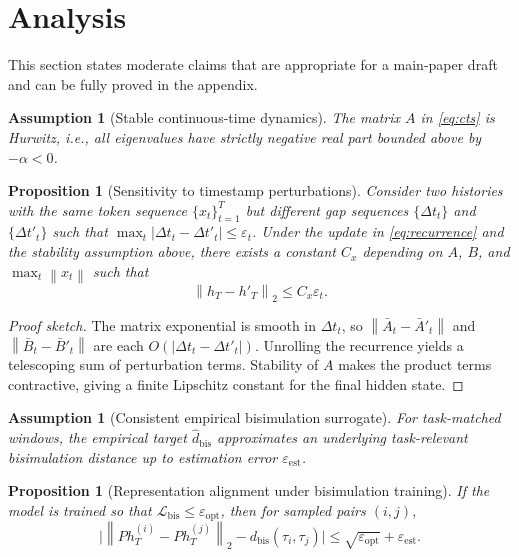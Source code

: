 \documentclass[11pt]{article}
\newtheorem{proposition}[theorem]{Proposition}
\newtheorem{assumption}[theorem]{Assumption}
\newcommand{\cL}{\mathcal{L}}
\newcommand{\dt}{\Delta t}
\newcommand{\norm}[1]{\left\lVert #1 \right\rVert}
\newcommand{\abs}[1]{\left\lvert #1 \right\rvert}
\newcommand{\traj}{\tau}
\begin{document}
\section{Analysis}

This section states moderate claims that are appropriate for a main-paper draft and can be fully proved in the appendix.

\begin{assumption}[Stable continuous-time dynamics]
The matrix $A$ in \cref{eq:cts} is Hurwitz, i.e., all eigenvalues have strictly negative real part bounded above by $-\alpha < 0$.
\end{assumption}

\begin{proposition}[Sensitivity to timestamp perturbations]
\label{prop:jitter}
Consider two histories with the same token sequence $\{x_t\}_{t=1}^{T}$ but different gap sequences $\{\dt_t\}$ and $\{\dt'_t\}$ such that $\max_t \abs{\dt_t-\dt'_t} \le \varepsilon_t$. Under the update in \cref{eq:recurrence} and the stability assumption above, there exists a constant $C_x$ depending on $A$, $B$, and $\max_t \norm{x_t}$ such that
\begin{equation}
\norm{h_T - h'_T}_2 \le C_x \varepsilon_t.
\label{eq:jitterbound}
\end{equation}
\end{proposition}

\begin{proof}[Proof sketch]
The matrix exponential is smooth in $\dt_t$, so $\norm{\bar A_t-\bar A'_t}$ and $\norm{\bar B_t-\bar B'_t}$ are each $O(\abs{\dt_t-\dt'_t})$. Unrolling the recurrence yields a telescoping sum of perturbation terms. Stability of $A$ makes the product terms contractive, giving a finite Lipschitz constant for the final hidden state.
\end{proof}

\begin{assumption}[Consistent empirical bisimulation surrogate]
For task-matched windows, the empirical target $\widehat{d}_{\mathrm{bis}}$ approximates an underlying task-relevant bisimulation distance up to estimation error $\varepsilon_{\mathrm{est}}$.
\end{assumption}

\begin{proposition}[Representation alignment under bisimulation training]
\label{prop:bisim}
If the model is trained so that $\cL_{\mathrm{bis}} \le \varepsilon_{\mathrm{opt}}$, then for sampled pairs $(i,j)$,
\begin{equation}
\Big| \norm{P h_T^{(i)} - P h_T^{(j)}}_2 - d_{\mathrm{bis}}(\traj_i,\traj_j) \Big|
\le \sqrt{\varepsilon_{\mathrm{opt}}} + \varepsilon_{\mathrm{est}}.
\label{eq:bisim_align}
\end{equation}
\end{proposition}
\end{document}
